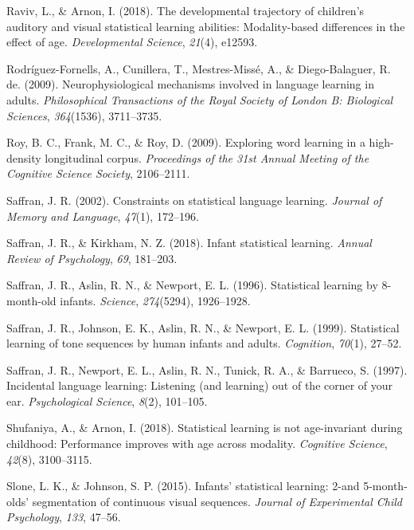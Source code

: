 \documentclass[man,mask,floatsintext]{apa6}
\theoremstyle{definition}
\theoremstyle{definition}
\theoremstyle{definition}
\theoremstyle{remark}
\begin{document}
\hypertarget{ref-raviv2018developmental}{}
Raviv, L., \& Arnon, I. (2018). The developmental trajectory of
children's auditory and visual statistical learning abilities:
Modality-based differences in the effect of age. \emph{Developmental
Science}, \emph{21}(4), e12593.

\hypertarget{ref-rodriguez2009neurophysiological}{}
Rodríguez-Fornells, A., Cunillera, T., Mestres-Missé, A., \&
Diego-Balaguer, R. de. (2009). Neurophysiological mechanisms involved in
language learning in adults. \emph{Philosophical Transactions of the
Royal Society of London B: Biological Sciences}, \emph{364}(1536),
3711--3735.

\hypertarget{ref-roy2009exploring}{}
Roy, B. C., Frank, M. C., \& Roy, D. (2009). Exploring word learning in
a high-density longitudinal corpus. \emph{Proceedings of the 31st Annual
Meeting of the Cognitive Science Society}, 2106--2111.

\hypertarget{ref-saffran2002constraints}{}
Saffran, J. R. (2002). Constraints on statistical language learning.
\emph{Journal of Memory and Language}, \emph{47}(1), 172--196.

\hypertarget{ref-saffran2018infant}{}
Saffran, J. R., \& Kirkham, N. Z. (2018). Infant statistical learning.
\emph{Annual Review of Psychology}, \emph{69}, 181--203.

\hypertarget{ref-saffran1996statistical}{}
Saffran, J. R., Aslin, R. N., \& Newport, E. L. (1996). Statistical
learning by 8-month-old infants. \emph{Science}, \emph{274}(5294),
1926--1928.

\hypertarget{ref-saffran1999statistical}{}
Saffran, J. R., Johnson, E. K., Aslin, R. N., \& Newport, E. L. (1999).
Statistical learning of tone sequences by human infants and adults.
\emph{Cognition}, \emph{70}(1), 27--52.

\hypertarget{ref-saffran1997incidental}{}
Saffran, J. R., Newport, E. L., Aslin, R. N., Tunick, R. A., \&
Barrueco, S. (1997). Incidental language learning: Listening (and
learning) out of the corner of your ear. \emph{Psychological Science},
\emph{8}(2), 101--105.

\hypertarget{ref-shufaniya2018statistical}{}
Shufaniya, A., \& Arnon, I. (2018). Statistical learning is not
age-invariant during childhood: Performance improves with age across
modality. \emph{Cognitive Science}, \emph{42}(8), 3100--3115.

\hypertarget{ref-slone2015infants}{}
Slone, L. K., \& Johnson, S. P. (2015). Infants' statistical learning:
2-and 5-month-olds' segmentation of continuous visual sequences.
\emph{Journal of Experimental Child Psychology}, \emph{133}, 47--56.
\end{document}
